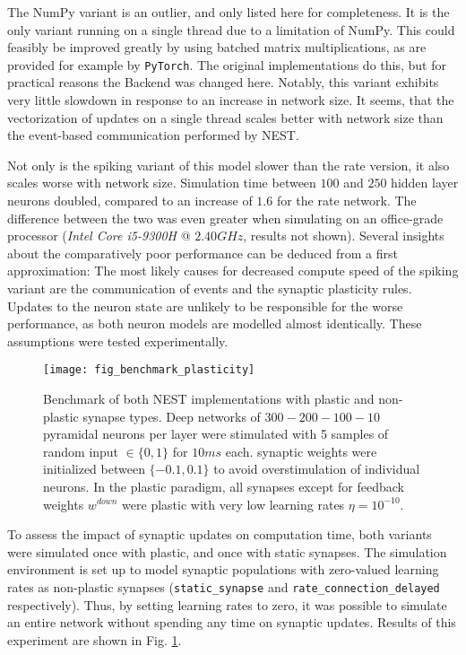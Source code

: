 The NumPy variant is an outlier, and only listed here for completeness. It is the only variant running on a single
thread due to a limitation of NumPy. This could feasibly be improved greatly by using batched matrix multiplications, as
are provided for example by \texttt{PyTorch}. The original implementations do this, but for practical reasons the
Backend was changed here. Notably, this variant exhibits very little slowdown in response to an increase in network
size. It seems, that the vectorization of updates on a single thread scales better with network size than the
event-based communication performed by NEST.

Not only is the spiking variant of this model slower than the rate version, it also scales worse with network size.
Simulation time between $100$ and $250$ hidden layer neurons doubled, compared to an increase of $1.6$ for the rate
network. The difference between the two was even greater when simulating on an office-grade processor (\textit{Intel
Core i5-9300H} @ $2.40GHz$, results not shown). Several insights about the comparatively poor performance can be deduced
from a first approximation: The most likely causes for decreased compute speed of the spiking variant are the
communication of events and the synaptic plasticity rules. Updates to the neuron state are unlikely to be responsible
for the worse performance, as both neuron models are modelled almost identically. These assumptions were tested
experimentally.



\begin{figure}[h]
    \centering
    \texttt{[image: fig\_benchmark\_plasticity]}
    \caption[Benchmark of both NEST implementations with plastic and non-plastic synapse types]{Benchmark of both NEST
        implementations with plastic and non-plastic synapse types. Deep networks of $300-200-100-10$ pyramidal neurons
        per layer were stimulated with 5 samples of random input $\in\{0,1\}$ for $10ms$ each. synaptic weights were
        initialized between $\{-0.1, 0.1 \}$ to avoid overstimulation of individual neurons. In the plastic paradigm,
        all synapses except for feedback weights $w^{down}$ were plastic with very low learning rates $\eta =
        10^{-10}$.}
    \label{fig-benchmark-plasticity}
\end{figure}


To assess the impact of synaptic updates on computation time, both variants were simulated once with plastic, and once
with static synapses. The simulation environment is set up to model synaptic populations with zero-valued learning rates
as non-plastic synapses (\texttt{static\_synapse} and \texttt{rate\_connection\_delayed} respectively). Thus, by setting
learning rates to zero, it was possible to simulate an entire network without spending any time on synaptic updates.
Results of this experiment are shown in Fig. \ref{fig-benchmark-plasticity}.

